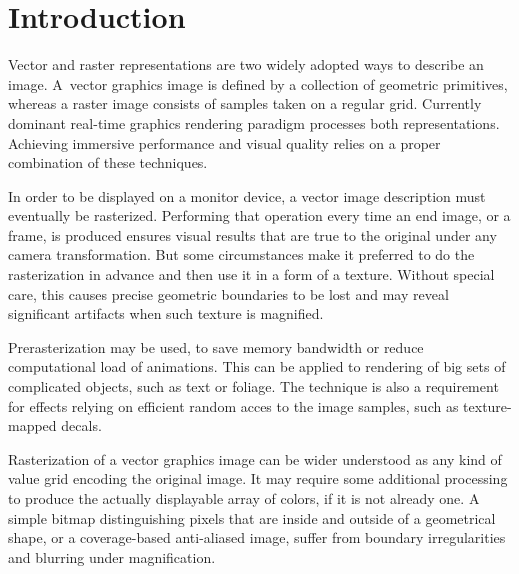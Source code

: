 \section{Introduction}

Vector and raster representations are two widely adopted ways to describe an image. A~vector graphics image is defined by a collection of geometric primitives, whereas a raster image consists of samples taken on a regular grid. Currently dominant real-time graphics rendering paradigm processes both representations. Achieving immersive performance and visual quality relies on a proper combination of these techniques.

In order to be displayed on a monitor device, a vector image description must eventually be rasterized. Performing that operation every time an end image, or a frame, is produced ensures visual results that are true to the original under any camera transformation. But some circumstances make it preferred to do the rasterization in advance and then use it in a form of a texture. Without special care, this causes precise geometric boundaries to be lost and may reveal significant artifacts when such texture is magnified.

Prerasterization may be used, to save memory bandwidth or reduce computational load of animations. This can be applied to rendering of big sets of complicated objects, such as text or foliage. The technique is also a requirement for effects relying on efficient random acces to the image samples, such as texture-mapped decals.

Rasterization of a vector graphics image can be wider understood as any kind of value grid encoding the original image. It may require some additional processing to produce the actually displayable array of colors, if it is not already one. A simple bitmap distinguishing pixels that are inside and outside of a geometrical shape, or a coverage-based anti-aliased image, suffer from boundary irregularities and blurring under magnification.